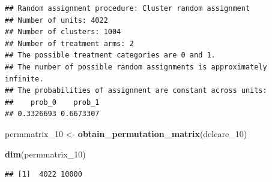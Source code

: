\documentclass[
]{article}
\newenvironment{Shaded}{\begin{snugshade}}{\end{snugshade}}
\newcommand{\AttributeTok}[1]{\textcolor[rgb]{0.13,0.29,0.53}{#1}}
\newcommand{\ConstantTok}[1]{\textcolor[rgb]{0.56,0.35,0.01}{#1}}
\newcommand{\ControlFlowTok}[1]{\textcolor[rgb]{0.13,0.29,0.53}{\textbf{#1}}}
\newcommand{\DecValTok}[1]{\textcolor[rgb]{0.00,0.00,0.81}{#1}}
\newcommand{\FunctionTok}[1]{\textcolor[rgb]{0.13,0.29,0.53}{\textbf{#1}}}
\newcommand{\NormalTok}[1]{#1}
\newcommand{\OtherTok}[1]{\textcolor[rgb]{0.56,0.35,0.01}{#1}}
\newcommand{\SpecialCharTok}[1]{\textcolor[rgb]{0.81,0.36,0.00}{\textbf{#1}}}
\begin{document}
\begin{verbatim}
## Random assignment procedure: Cluster random assignment 
## Number of units: 4022 
## Number of clusters: 1004
## Number of treatment arms: 2 
## The possible treatment categories are 0 and 1.
## The number of possible random assignments is approximately infinite. 
## The probabilities of assignment are constant across units: 
##    prob_0    prob_1 
## 0.3326693 0.6673307
\end{verbatim}

\begin{Shaded}
\begin{Highlighting}[]
\NormalTok{permmatrix\_10 }\OtherTok{\textless{}{-}} \FunctionTok{obtain\_permutation\_matrix}\NormalTok{(delcare\_10)}

\FunctionTok{dim}\NormalTok{(permmatrix\_10)}
\end{Highlighting}
\end{Shaded}

\begin{verbatim}
## [1]  4022 10000
\end{verbatim}

\begin{Shaded}
\end{Shaded}
\end{document}
